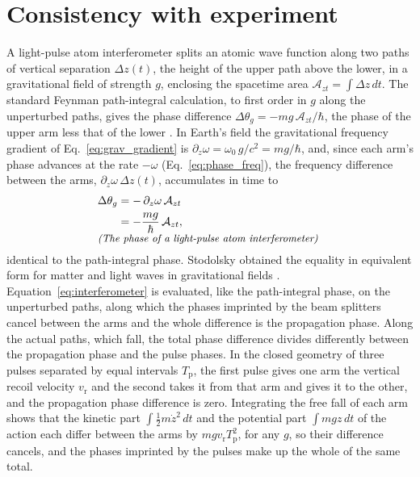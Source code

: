 \documentclass[aps,prd,onecolumn,tightenlines,nofootinbib,notitlepage,11pt,floatfix]{revtex4-2}
\theoremstyle{indentedtheorem}
\begin{document}
\section{Consistency with experiment}
\label{sec:experiment}

A light-pulse atom interferometer splits an atomic wave function along two paths of vertical separation $\Delta z(t)$, the height of the upper path above the lower, in a gravitational field of strength $g$, enclosing the spacetime area $\mathcal{A}_{zt}=\int\Delta z\,dt$. The standard Feynman path-integral calculation, to first order in $g$ along the unperturbed paths, gives the phase difference $\Delta\theta_g=-mg \, \mathcal{A}_{zt}/\hbar$, the phase of the upper arm less that of the lower \citep{Anandan1977Gravitational,Kasevich1992Measurement,Storey1994Feynman,Peters1999Measurement}. In Earth's field the gravitational frequency gradient of Eq.~\eqref{eq:grav_gradient} is $\partial_z\omega=\omega_0 \, g/c^2=mg/\hbar$, and, since each arm's phase advances at the rate $-\omega$ (Eq.~\eqref{eq:phase_freq}), the frequency difference between the arms, $\partial_z\omega\,\Delta z(t)$, accumulates in time to
\begin{align}
    \Delta\theta_g &= -\,\partial_z\omega\,\mathcal{A}_{zt} \notag\\
    &= -\frac{mg}{\hbar}\,\mathcal{A}_{zt} ,
    \label{eq:interferometer} \\[-3pt]
    \multispan2{\hfil\text{\small\itshape (The phase of a light-pulse atom interferometer)}\hfil} \notag
\end{align}
identical to the path-integral phase. Stodolsky obtained the equality in equivalent form for matter and light waves in gravitational fields \citep{Stodolsky1979Matter}. Equation~\eqref{eq:interferometer} is evaluated, like the path-integral phase, on the unperturbed paths, along which the phases imprinted by the beam splitters cancel between the arms and the whole difference is the propagation phase. Along the actual paths, which fall, the total phase difference divides differently between the propagation phase and the pulse phases. In the closed geometry of three pulses separated by equal intervals $T_\text{p}$, the first pulse gives one arm the vertical recoil velocity $v_\text{r}$ and the second takes it from that arm and gives it to the other, and the propagation phase difference is zero. Integrating the free fall of each arm shows that the kinetic part $\int\tfrac{1}{2}m\dot{z}^2\,dt$ and the potential part $\int mgz\,dt$ of the action each differ between the arms by $mgv_\text{r}T_\text{p}^2$, for any $g$, so their difference cancels, and the phases imprinted by the pulses make up the whole of the same total.
\end{document}
